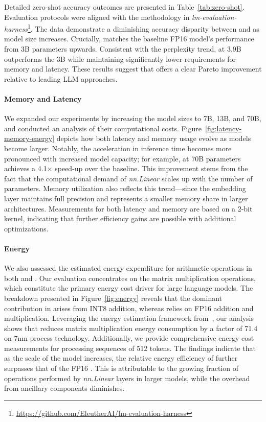 Detailed zero-shot accuracy outcomes are presented in Table~\ref{tab:zero-shot}. Evaluation protocols were aligned with the methodology in \emph{lm-evaluation-harness}\footnote{\url{https://github.com/EleutherAI/lm-evaluation-harness}}. The data demonstrate a diminishing accuracy disparity between  and  as model size increases. Crucially,  matches the baseline FP16 model's performance from 3B parameters upwards. Consistent with the perplexity trend,  at 3.9B outperforms the 3B  while maintaining significantly lower requirements for memory and latency. These results suggest that  offers a clear Pareto improvement relative to leading LLM approaches.

\paragraph{Memory and Latency}

We expanded our experiments by increasing the model sizes to 7B, 13B, and 70B, and conducted an analysis of their computational costs. Figure~\ref{fig:latency-memory-energy} depicts how both latency and memory usage evolve as models become larger. Notably, the acceleration in inference time becomes more pronounced with increased model capacity; for example,  at 70B parameters achieves a 4.1$\times$ speed-up over the  baseline. This improvement stems from the fact that the computational demand of \emph{nn.Linear} scales up with the number of parameters. Memory utilization also reflects this trend—since the embedding layer maintains full precision and represents a smaller memory share in larger architectures. Measurements for both latency and memory are based on a 2-bit kernel, indicating that further efficiency gains are possible with additional optimizations.

\paragraph{Energy}

We also assessed the estimated energy expenditure for arithmetic operations in both  and . Our evaluation concentrates on the matrix multiplication operations, which constitute the primary energy cost driver for large language models. The breakdown presented in Figure~\ref{fig:energy} reveals that the dominant contribution in  arises from INT8 addition, whereas  relies on FP16 addition and multiplication. Leveraging the energy estimation framework from~\cite{energycost, pokebnn}, our analysis shows that  reduces matrix multiplication energy consumption by a factor of 71.4 on 7nm process technology. Additionally, we provide comprehensive energy cost measurements for processing sequences of 512 tokens. The findings indicate that as the scale of the model increases, the relative energy efficiency of  further surpasses that of the FP16 . This is attributable to the growing fraction of operations performed by \emph{nn.Linear} layers in larger models, while the overhead from ancillary components diminishes.

